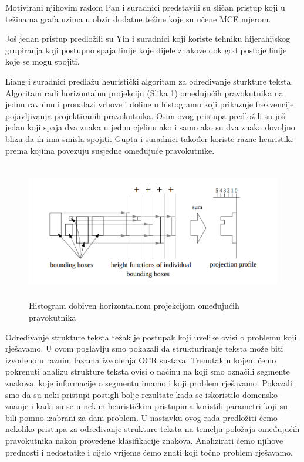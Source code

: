 \documentclass[times, utf8, zavrsni]{fer}
\begin{document}
Motivirani njihovim radom Pan i suradnici \citep{pan2011hybrid} predstavili su sličan pristup
koji u težinama grafa uzima u obzir dodatne težine koje su učene MCE  mjerom.

Još jedan pristup predložili su Yin i suradnici \citep{DBLP:journals/corr/abs-1301-2628} koji koriste
tehniku hijerahijskog grupiranja koji postupno spaja linije koje dijele znakove dok god
postoje linije koje se mogu spojiti. \citep{DBLP:journals/corr/TianPHLYT16}

Liang i suradnici \citep{liang1996document} predlažu heuristički algoritam za određivanje sturkture
teksta. Algoritam radi horizontalnu projekciju (Slika \ref{fig:histogram-projection}) omeđujućih pravokutnika na jednu ravninu i pronalazi
vrhove i doline u histogramu koji prikazuje frekvencije pojavljivanja projektiranih pravokutnika.
Osim ovog pristupa predložili su još jedan koji spaja dva znaka u jednu cjelinu ako i samo ako
su dva znaka dovoljno blizu da ih ima smisla spojiti. Gupta i suradnici \citep{gupta2006document} također koriste razne heuristike prema kojima
povezuju susjedne omeđujuće pravokutnike.

\pagebreak

\begin{figure}[htb]
    \centering
    \includegraphics[height=6cm]{images/histogram-projection.png}
    \caption{Histogram dobiven horizontalnom projekcijom omeđujućih pravokutnika \citep{liang1996document}}
    \label{fig:histogram-projection}
\end{figure}

Određivanje strukture teksta težak je postupak koji uvelike ovisi o problemu koji rješavamo. U ovom
poglavlju smo pokazali da strukturiranje teksta može biti izvođeno u raznim fazama izvođenja OCR
sustava. Trenutak u kojem ćemo pokrenuti analizu strukture teksta ovisi o načinu na koji smo
označili segmente znakova, koje informacije o segmentu imamo i koji problem rješavamo.
Pokazali smo da su neki pristupi postigli bolje rezultate kada se iskoristilo domensko znanje
i kada su se u nekim heurističkim pristupima koristili parametri koji su bili pomno
izabrani za dani problem.
U nastavku ovog rada predložiti ćemo nekoliko pristupa za određivanje strukture teksta na temelju položaja omeđujućih pravokutnika nakon provedene klasifikacije
znakova. Analizirati ćemo njihove prednosti i nedostatke i cijelo vrijeme ćemo znati koji točno problem rješavamo.
\end{document}
